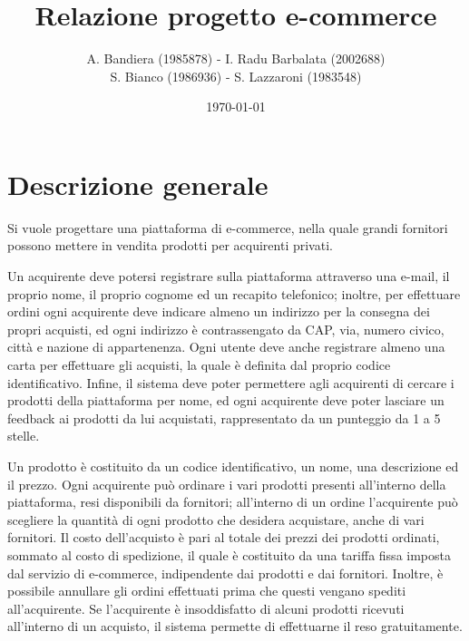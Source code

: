 \documentclass[12pt]{report}
\begin{document}
    \renewcommand{\labelenumii}{\arabic{enumi}.\arabic{enumii}}
    \renewcommand{\labelenumiii}{\arabic{enumi}.\arabic{enumii}.\arabic{enumiii}}
    \renewcommand{\labelenumiv}{\arabic{enumi}.\arabic{enumii}.\arabic{enumiii}.\arabic{enumiv}}

    \title{Relazione progetto e-commerce}
    \author{A. Bandiera (1985878) - I. Radu Barbalata (2002688)\\S. Bianco (1986936) - S. Lazzaroni (1983548)}
    \date{\today}

    \maketitle
    \tableofcontents
    \newpage

    \chapter{Descrizione generale}
    

    Si vuole progettare una piattaforma di e-commerce, nella quale grandi fornitori possono mettere in vendita prodotti per acquirenti privati.

    Un acquirente deve potersi registrare sulla piattaforma attraverso una e-mail, il proprio nome, il proprio cognome ed un recapito telefonico; inoltre, per effettuare ordini ogni acquirente deve indicare almeno un indirizzo per la consegna dei propri acquisti, ed ogni indirizzo è contrassengato da CAP, via, numero civico, città e nazione di appartenenza. Ogni utente deve anche registrare almeno una carta per effettuare gli acquisti, la quale è definita dal proprio codice identificativo. Infine, il sistema deve poter permettere agli acquirenti di cercare i prodotti della piattaforma per nome, ed ogni acquirente deve poter lasciare un feedback ai prodotti da lui acquistati, rappresentato da un punteggio da 1 a 5 stelle.

    Un prodotto è costituito da un codice identificativo, un nome, una descrizione ed il prezzo. Ogni acquirente può ordinare i vari prodotti presenti all'interno della piattaforma, resi disponibili da fornitori; all'interno di un ordine l'acquirente può scegliere la quantità di ogni prodotto che desidera acquistare, anche di vari fornitori. Il costo dell'acquisto è pari al totale dei prezzi dei prodotti ordinati, sommato al costo di spedizione, il quale è costituito da una tariffa fissa imposta dal servizio di e-commerce, indipendente dai prodotti e dai fornitori. Inoltre, è possibile annullare gli ordini effettuati prima che questi vengano spediti all'acquirente. Se l'acquirente è insoddisfatto di alcuni prodotti ricevuti all'interno di un acquisto, il sistema permette di effettuarne il reso gratuitamente.
\end{document}
